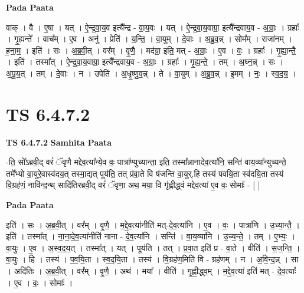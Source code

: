 \documentclass[17pt]{extarticle}
\begin{document}
\textbf{Pada Paata} \newline

वाक् । वै । ए॒षा । यत् । ऐ॒न्द्र॒वा॒य॒व इत्यै᳚न्द्र - वा॒य॒वः । यत् । ऐ॒न्द्र॒वा॒य॒वाग्रा॒ इत्यै᳚न्द्रवाय॒व - अ॒ग्राः॒ । ग्रहाः᳚ । गृ॒ह्यन्ते᳚ । वाच᳚म् । ए॒व । अनु॑ । प्रेति॑ । य॒न्ति॒ । वा॒युम् । दे॒वाः । अ॒ब्रु॒व॒न्न् । सोम᳚म् । राजा॑नम् । ह॒ना॒म॒ । इति॑ । सः । अ॒ब्र॒वी॒त् । वर᳚म् । वृ॒णै॒ । मद॑ग्रा॒ इति॒ मत् - अ॒ग्राः॒ । ए॒व । वः॒ । ग्रहाः᳚ । गृ॒ह्या॒न्तै॒ । इति॑ । तस्मा᳚त् । ऐ॒न्द्र॒वा॒य॒वाग्रा॒ इत्यै᳚न्द्रवाय॒व - अ॒ग्राः॒ । ग्रहाः᳚ । गृ॒ह्य॒न्ते॒ । तम् । अ॒घ्न॒न्न् । सः । अ॒पू॒य॒त् । तम् । दे॒वाः । न । उपेति॑ । अ॒धृ॒ष्णु॒व॒न्न् । ते । वा॒युम् । अ॒ब्रु॒व॒न्न् । इ॒मम् । नः॒ । स्व॒द॒य॒ ।  \newline





\section{ TS 6.4.7.2 }

\textbf{TS 6.4.7.2 } \newline
\textbf{Samhita Paata} \newline

-ति॒ सो᳚ऽब्रवी॒द् वरं॑ ॅवृणै मद्देव॒त्या᳚न्ये॒व वः॒ पात्रा᳚ण्युच्यान्ता॒ इति॒ तस्मा᳚न्नानादेव॒त्या॑नि॒ सन्ति॑ वाय॒व्या᳚न्युच्यन्ते॒ तमे᳚भ्यो वा॒युरे॒वास्व॑दय॒त् तस्मा॒द्यत् पूय॑ति॒ तत् प्र॑वा॒ते वि ष॑जन्ति वा॒युर्.हि तस्य॑ पवयि॒ता स्व॑दयि॒ता तस्य॑ वि॒ग्रह॑णं॒ नावि॑न्द॒न्थ् सादि॑तिरब्रवी॒द् वरं॑ ॅवृणा॒ अथ॒ मया॒ वि गृ॑ह्णीद्ध्वं मद्देव॒त्या॑ ए॒व वः॒ सोमाः᳚ - [  ] \newline

\textbf{Pada Paata} \newline

इति॑ । सः । अ॒ब्र॒वी॒त् । वर᳚म् । वृ॒णै॒ । म॒द्दे॒व॒त्या॑नीति॑ मत्-दे॒व॒त्या॑नि । ए॒व । वः॒ । पात्रा॑णि । उ॒च्या॒न्तै॒ । इति॑ । तस्मा᳚त् । ना॒ना॒दे॒व॒त्या॑नीति॑ नाना - दे॒व॒त्या॑नि । सन्ति॑ । वा॒य॒व्या॑नि । उ॒च्य॒न्ते॒ । तम् । ए॒भ्यः॒ । वा॒युः । ए॒व । अ॒स्व॒द॒य॒त् । तस्मा᳚त् । यत् । पूय॑ति । तत् । प्र॒वा॒त इति॑ प्र - वा॒ते । वीति॑ । स॒ज॒न्ति॒ । वा॒युः । हि । तस्य॑ । प॒व॒यि॒ता । स्व॒द॒यि॒ता । तस्य॑ । वि॒ग्रह॑ण॒मिति॑ वि - ग्रह॑णम् । न । अ॒वि॒न्द॒न्न् । सा । अदि॑तिः । अ॒ब्र॒वी॒त् । वर᳚म् । वृ॒णै॒ । अथ॑ । मया᳚ । वीति॑ । गृ॒ह्णी॒द्ध्व॒म् । म॒द्दे॒व॒त्या॑ इति॑ मत् - दे॒व॒त्याः᳚ । ए॒व । वः॒ । सोमाः᳚ ।  \newline
\end{document}

